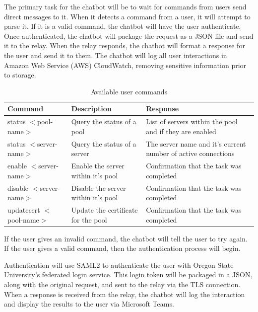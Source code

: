 \documentclass[onecolumn, draftclsnofoot,10pt, compsoc]{IEEEtran}
\begin{document}
The primary task for the chatbot will be to wait for commands from users send direct messages to it.
When it detects a command from a user, it will attempt to parse it.
If it is a valid command, the chatbot will have the user authenticate.
Once authenticated, the chatbot will package the request as a JSON file and send it to the relay.
When the relay responds, the chatbot will format a response for the user and send it to them.
The chatbot will log all user interactions in Amazon Web Service (AWS) CloudWatch, removing sensitive information prior to storage.

\begin{table}[h]
    \caption{Available user commands}
    \begin{tabular}{ p{1.5in} p{2.5in} p{2.5in}  }
     \textbf{Command} & \textbf{Description} & \textbf{Response} \\
     \hline
     status $<$pool-name$>$
     & Query the status of a pool
     & List of servers within the pool and if they are enabled \\
     \hline
     status $<$server-name$>$
     & Query the status of a server
     & The server name and it's current number of active connections \\
     \hline
     enable $<$server-name$>$
     & Enable the server within it's pool
     & Confirmation that the task was completed \\
     \hline
     disable $<$server-name$>$
     & Disable the server within it's pool
     & Confirmation that the task was completed \\
     \hline
     updatecert $<$pool-name$>$
     & Update the certificate for the pool
     & Confirmation that the task was completed \\
     \hline
    \end{tabular}
    \label{tab:commands}
\end{table}

If the user gives an invalid command, the chatbot will tell the user to try again.
If the user gives a valid command, then the authentication process will begin.

Authentication will use SAML2 to authenticate the user with Oregon State University's federated login service.
This login token will be packaged in a JSON, along with the original request, and sent to the relay via the TLS connection.
When a response is received from the relay, the chatbot will log the interaction and display the results to the user via Microsoft Teams.
\end{document}
